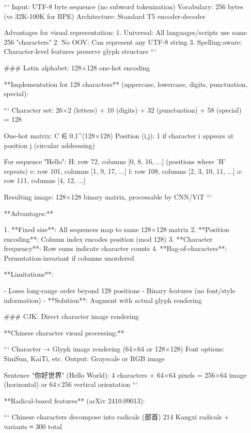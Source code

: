 \documentclass[11pt]{article}
\begin{document}
```
Input: UTF-8 byte sequence (no subword tokenization)
Vocabulary: 256 bytes (vs 32K-100K for BPE)
Architecture: Standard T5 encoder-decoder

Advantages for visual representation:
1. Universal: All languages/scripts use same 256 "characters"
2. No OOV: Can represent any UTF-8 string
3. Spelling-aware: Character-level features preserve glyph structure
```

### Latin alphabet: 128×128 one-hot encoding

**Implementation for 128 characters** (uppercase, lowercase, digits, punctuation, special):

```
Character set: 26×2 (letters) + 10 (digits) + 32 (punctuation) + 58 (special) = 128

One-hot matrix: C ∈ {0,1}^(128×128)
Position (i,j): 1 if character i appears at position j (circular addressing)

For sequence "Hello":
H: row 72, columns [0, 8, 16, ...]  (positions where 'H' repeats)
e: row 101, columns [1, 9, 17, ...]
l: row 108, columns [2, 3, 10, 11, ...]
o: row 111, columns [4, 12, ...]

Resulting image: 128×128 binary matrix, processable by CNN/ViT
```

**Advantages:**

1. **Fixed size**: All sequences map to same 128×128 matrix
2. **Position encoding**: Column index encodes position (mod 128)
3. **Character frequency**: Row sums indicate character counts
4. **Bag-of-characters**: Permutation-invariant if columns unordered

**Limitations**: 

- Loses long-range order beyond 128 positions
- Binary features (no font/style information)
- **Solution**: Augment with actual glyph rendering

### CJK: Direct character image rendering

**Chinese character visual processing:**

```
Character → Glyph image rendering (64×64 or 128×128)
Font options: SimSun, KaiTi, etc.
Output: Grayscale or RGB image

Sentence "你好世界" (Hello World):
4 characters × 64×64 pixels = 256×64 image (horizontal)
or 64×256 vertical orientation
```

**Radical-based features** (arXiv 2410.09013):

```
Chinese characters decompose into radicals (部首)
214 Kangxi radicals + variants ≈ 300 total
\end{document}
